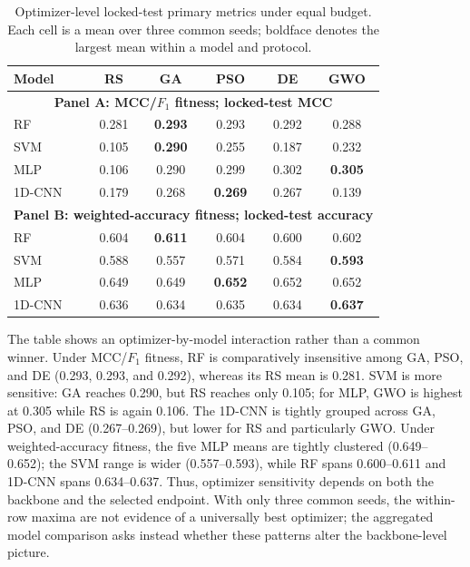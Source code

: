 \begin{table}[htbp]
\centering
\caption{Optimizer-level locked-test primary metrics under equal budget. Each cell is a mean over three common seeds; boldface denotes the largest mean within a model and protocol.}
\label{tab:optimizer_primary_metrics}
\manuscripttablestyle
\begin{tabular}{lccccc}\toprule
\textbf{Model} & \textbf{RS} & \textbf{GA} & \textbf{PSO} & \textbf{DE} & \textbf{GWO}\\\midrule
\multicolumn{6}{c}{\textbf{Panel A: MCC/$F_1$ fitness; locked-test MCC}}\\\midrule
RF & 0.281 & \textbf{0.293} & 0.293 & 0.292 & 0.288\\
SVM & 0.105 & \textbf{0.290} & 0.255 & 0.187 & 0.232\\
MLP & 0.106 & 0.290 & 0.299 & 0.302 & \textbf{0.305}\\
1D-CNN & 0.179 & 0.268 & \textbf{0.269} & 0.267 & 0.139\\\midrule
\multicolumn{6}{c}{\textbf{Panel B: weighted-accuracy fitness; locked-test accuracy}}\\\midrule
RF & 0.604 & \textbf{0.611} & 0.604 & 0.600 & 0.602\\
SVM & 0.588 & 0.557 & 0.571 & 0.584 & \textbf{0.593}\\
MLP & 0.649 & 0.649 & \textbf{0.652} & 0.652 & 0.652\\
1D-CNN & 0.636 & 0.634 & 0.635 & 0.634 & \textbf{0.637}\\\bottomrule
\end{tabular}
\end{table}

The table shows an optimizer-by-model interaction rather than a common winner. Under MCC/$F_1$ fitness, RF is comparatively insensitive among GA, PSO, and DE (0.293, 0.293, and 0.292), whereas its RS mean is 0.281. SVM is more sensitive: GA reaches 0.290, but RS reaches only 0.105; for MLP, GWO is highest at 0.305 while RS is again 0.106. The 1D-CNN is tightly grouped across GA, PSO, and DE (0.267--0.269), but lower for RS and particularly GWO. Under weighted-accuracy fitness, the five MLP means are tightly clustered (0.649--0.652); the SVM range is wider (0.557--0.593), while RF spans 0.600--0.611 and 1D-CNN spans 0.634--0.637. Thus, optimizer sensitivity depends on both the backbone and the selected endpoint. With only three common seeds, the within-row maxima are not evidence of a universally best optimizer; the aggregated model comparison asks instead whether these patterns alter the backbone-level picture.

